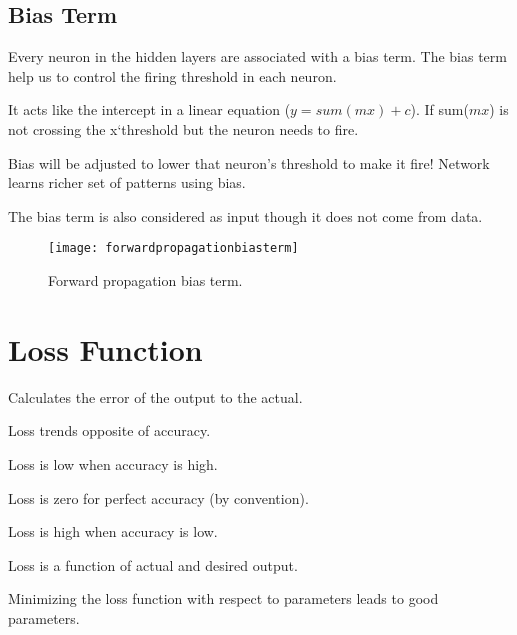 	\subsection{Bias Term}
	\begin{bulletedlist}
		\item Every neuron in the hidden layers are associated with a bias term. The bias term help us to control the firing threshold in each neuron.
		\item It acts like the intercept in a linear equation ($y = sum(mx) + c$). If sum($mx$) is not crossing the x`threshold but the neuron needs to fire.
		\item Bias will be adjusted to lower that neuron's threshold to make it fire! Network learns richer set of patterns using bias.
		\item The bias term is also considered as input though it does not come from data.
	\end{bulletedlist}
 	\begin{figure}[h]
		\centering
		\texttt{[image: forwardpropagationbiasterm]}
		\caption[Forward propagation bias term]{Forward propagation bias term.}
		\label{fig:forwardpropagationbiasterm}
	\end{figure}


	\section{Loss Function}
Calculates the error of the output to the actual.
	\begin{bulletedlist}
		\item Loss trends opposite of accuracy.
		\begin{bulletedlist}
			\item Loss is low when accuracy is high.
			\item Loss is zero for perfect accuracy (by convention).
			\item Loss is high when accuracy is low.
		\end{bulletedlist}
		\item Loss is a function of actual and desired output.
		\item Minimizing the loss function with respect to parameters leads to good parameters.
	\end{bulletedlist}

